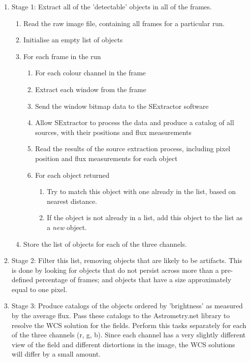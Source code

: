 \begin{enumerate}
	\item Stage 1: Extract all of the 'detectable' objects in all of the frames. 
	\begin{enumerate}
		\item Read the raw image file, containing all frames for a particular run.
		\item Initialise an empty list of objects
		\item For each frame in the run
		\begin{enumerate}
			\item For each colour channel in the frame
			\item Extract each window from the frame
			\item Send the window bitmap data to the SExtractor software
			\item Allow SExtractor to process the data and produce a catalog of all sources, with their positions and flux measurements
			\item Read the results of the source extraction process, including pixel position and flux measurements for each object
			\item For each object returned
			\begin{enumerate} 
				\item Try to match this object with one already in the list, based on nearest distance.
				\item If the object is not already in a list, add this object to the list as a \emph{new} object.
			\end{enumerate}
		\end{enumerate}
		\item Store the list of objects for each of the three channels.
	\end{enumerate}
	\item Stage 2: Filter this list, removing objects that are likely to be artifacts. This is done by looking for objects that do not persist across more than a pre-defined percentage of frames; and objects that have a size approximately equal to one pixel. 
	\item Stage 3: Produce catalogs of the objects ordered by 'brightness' as measured by the average flux. Pass these catalogs to the Astrometry.net library to resolve the WCS solution for the fields. Perform this tasks separately for each of the three channels (r, g, b). Since each channel has a very slightly different view of the field and different distortions in the image, the WCS solutions will differ by a small amount.

\end{enumerate}

